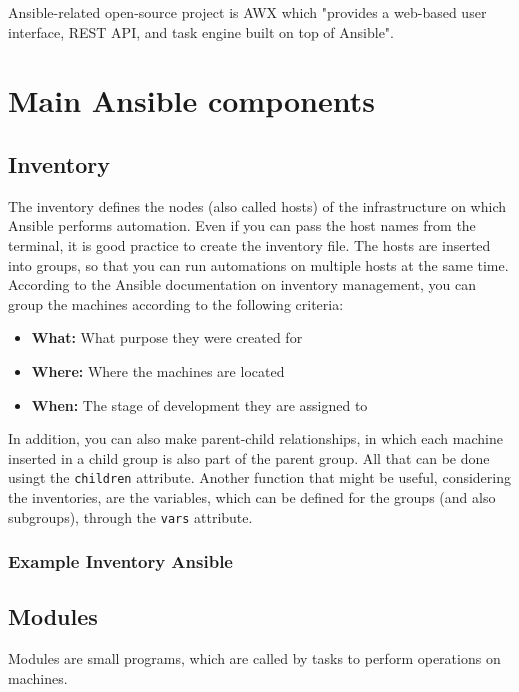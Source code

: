 \documentclass[12pt,a4paper,openright,twoside]{book}
\begin{document}
Ansible-related open-source project is AWX which "provides a web-based user interface, REST API, and task engine built on top of Ansible"\cite{ansibleAWX}.

\section{Main Ansible components}

\subsection{Inventory}
            The inventory defines the nodes (also called hosts) of the infrastructure on which Ansible performs automation.
            Even if you can pass the host names from the terminal, it is good practice to create the inventory file.
            The hosts are inserted into groups, so that you can run automations on multiple hosts at the same time.
            According to the Ansible documentation on inventory management\cite{ansibleDocInventory}, you can group the machines according to the following criteria:
            
            \begin{itemize}
                \item \textbf{What:} What purpose they were created for
                \item \textbf{Where:} Where the machines are located
                \item \textbf{When:} The stage of development they are assigned to
            \end{itemize}
            
            In addition, you can also make parent-child relationships, in which each machine inserted in a child group is also part of the parent group. All that can be done usingt the \texttt{children} attribute.
            Another function that might be useful, considering the inventories, are the variables, which can be defined for the groups (and also subgroups), through the \texttt{vars} attribute.

\subsubsection{Example Inventory Ansible}



\subsection{Modules}
Modules are small programs, which are called by tasks to perform operations on machines.
\end{document}
